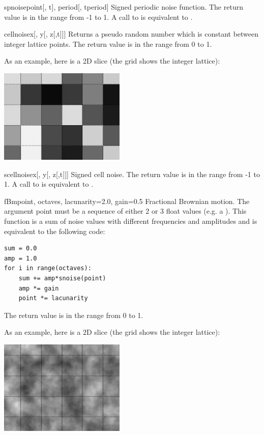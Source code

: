 \begin{funcdesc}{spnoise}{point[, t], period[, tperiod]}
Signed periodic noise function. The return value is in the range from
-1 to 1. A call to  is equivalent to 
.
\end{funcdesc}

\begin{funcdesc}{cellnoise}{x[, y[, z[,t]]]}
Returns a pseudo random number which is constant between integer
lattice points. The return value is in the range from 0 to 1.

As an example, here is a 2D slice (the grid shows the integer lattice):

\begin{center}
\includegraphics[width=6cm]{pics/cellnoise}
\end{center}
\end{funcdesc}

\begin{funcdesc}{scellnoise}{x[, y[, z[,t]]]}
Signed cell noise. The return value is in the range from -1 to 1. A
call to  is equivalent to .
\end{funcdesc}

\begin{funcdesc}{fBm}{point, octaves, lacunarity=2.0, gain=0.5}
Fractional Brownian motion. The argument point must be a sequence of
either 2 or 3 float values (e.g. a ). This function is a sum of
noise values with different frequencies and amplitudes and is
equivalent to the following code:

\begin{verbatim}
sum = 0.0
amp = 1.0
for i in range(octaves):
    sum += amp*snoise(point)
    amp *= gain
    point *= lacunarity
\end{verbatim}

The return value is in the range from 0 to 1.

As an example, here is a 2D slice (the grid shows the integer lattice):

\begin{center}
\includegraphics[width=6cm]{pics/fbm}
\end{center}
\end{funcdesc}


